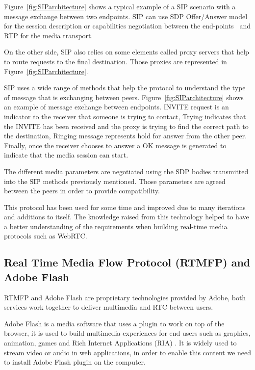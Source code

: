 Figure~\ref{fig:SIParchitecture} shows a typical example of a SIP scenario with a message exchange between two endpoints. SIP can use SDP Offer/Answer model for the session description or capabilities negotiation between the end-points~\cite{sdpIETF} and RTP for the media transport.

On the other side, SIP also relies on some elements called proxy servers that help to route requests to the final destination. Those proxies are represented in Figure~\ref{fig:SIParchitecture}.

SIP uses a wide range of methods that help the protocol to understand the type of message that is exchanging between peers. Figure~\ref{fig:SIParchitecture} shows an example of message exchange between endpoints. INVITE request is an indicator to the receiver that someone is trying to contact, Trying indicates that the INVITE has been received and the proxy is trying to find the correct path to the destination, Ringing message represents hold for answer from the other peer. Finally, once the receiver chooses to answer a OK message is generated to indicate that the media session can start. 

The different media parameters are negotiated using the SDP bodies transmitted into the SIP methods previously mentioned. Those parameters are agreed between the peers in order to provide compatibility.

This protocol has been used for some time and improved due to many iterations and additions to itself. The knowledge raised from this technology helped to have a better understanding of the requirements when building real-time media protocols such as WebRTC.

\subsection{Real Time Media Flow Protocol (RTMFP) and Adobe Flash}

RTMFP   and Adobe Flash are proprietary technologies provided by Adobe, both services work together to deliver multimedia and RTC between users.

Adobe Flash is a media software that uses a plugin to work on top of the browser, it is used to build multimedia experiences for end users such as graphics, animation, games and Rich Internet Applications (RIA) . It is widely used to stream video or audio in web applications, in order to enable this content we need to install Adobe Flash plugin on the computer. 

